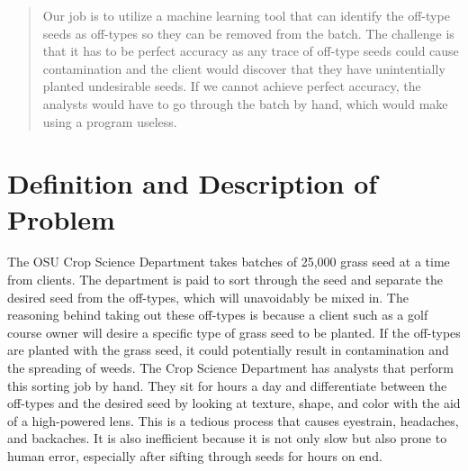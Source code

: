 \documentclass[onecolumn, draftclsnofoot,10pt, compsoc]{IEEEtran}
\begin{document}
\begin{titlepage}
\begin{singlespace}
\begin{abstract}
			Our job is to utilize a machine learning tool that can identify the off-type seeds as off-types so they can be removed from the batch. The challenge is that it has to be perfect accuracy as any trace of off-type seeds could cause contamination and  the client would discover that they have unintentially planted undesirable seeds. If we cannot achieve perfect accuracy, the analysts would have to go through the batch by hand, which would make using a program useless. 


        \end{abstract}     
    \end{singlespace}
\end{titlepage}
\newpage
{}
\tableofcontents
\clearpage

\section{Definition and Description of Problem}

The OSU Crop Science Department takes batches of 25,000 grass seed at a time from clients. The department is paid to sort through the seed and separate the desired seed from the off-types, which will unavoidably be mixed in. The reasoning behind taking out these off-types is because a client such as a golf course owner will desire a specific type of grass seed to be planted. If the off-types are planted with the grass seed, it could potentially result in contamination and the spreading of weeds. 
The Crop Science Department has analysts that perform this sorting job by hand. They sit for hours a day and differentiate between the off-types and the desired seed by looking at texture, shape, and color with the aid of a high-powered lens. This is a tedious process that causes eyestrain, headaches, and backaches. It is also inefficient because it is not only slow but also prone to human error, especially after sifting through seeds for hours on end. 
\end{document}

